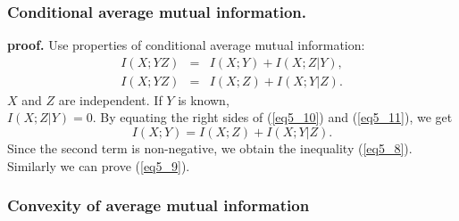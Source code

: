 \documentclass[14pt]{beamer}
\begin{document}
\begin{frame}
\frametitle{Conditional average mutual information.}

    \textbf{proof.} Use properties of conditional average mutual information:
    \begin{eqnarray}
    \label{eq5_10} I(X;YZ) &=& I(X;Y) + I(X;Z\vert Y), \\
    \label{eq5_11} I(X;YZ) &=& I(X;Z) + I(X;Y\vert Z).
    \end{eqnarray}
    $X$ and $Z$ are independent. If $Y$ is known, \\
    $I(X;Z\vert Y) = 0$.
    By equating the right sides of (\ref{eq5_10}) and
    (\ref{eq5_11}), we get
    \[
    I(X;Y) = I(X;Z) + I(X;Y\vert Z).
    \]
    Since the second term is non-negative, we obtain the inequality
    (\ref{eq5_8}). Similarly we can prove (\ref{eq5_9}).

\end{frame}




\begin{frame}
\frametitle{Convexity of average mutual information}
\begin{itemize}



\end{itemize}
\end{frame}
\end{document}
